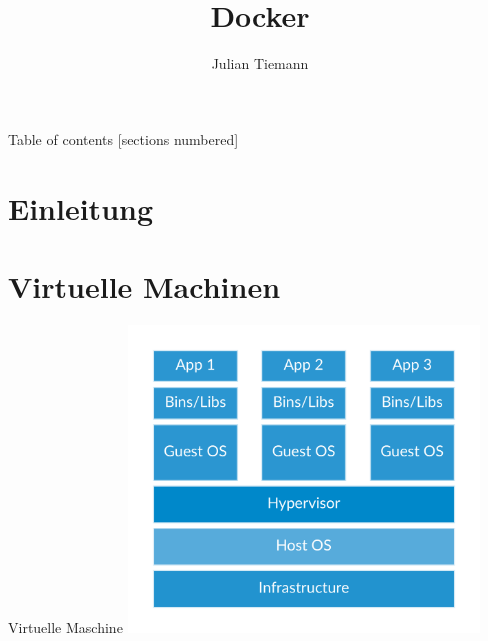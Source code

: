 \documentclass[10pt]{beamer}
\title{Docker}
\date{}
\author{Julian Tiemann}
\institute{Universit\"at Hamburg}
\begin{document}
\maketitle

\begin{frame}{Table of contents}
  [sections numbered]
  \tableofcontents[hideallsubsections]
\end{frame}

\section{Einleitung}

%
%

\section{Virtuelle Machinen}

\begin{frame}{Virtuelle Maschine}
  \center
  \includegraphics[width=0.7\textwidth]{../images/1-docker-vm.png}
\end{frame}
\end{document}
